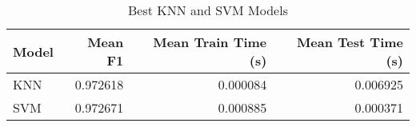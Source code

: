 \begin{table}[!htbp]
\centering
\caption{Best KNN and SVM Models}
\label{tab:best_knn_and_svm_summary_hepatitis}
\begin{tabular}{lrrr}
\toprule
Model & Mean F1 & Mean Train Time (s) & Mean Test Time (s) \\
\midrule
KNN & 0.972618 & 0.000084 & 0.006925 \\
SVM & 0.972671 & 0.000885 & 0.000371 \\
\bottomrule
\end{tabular}
\end{table}
